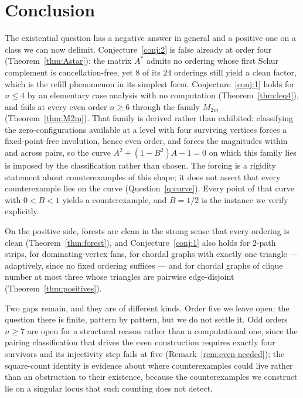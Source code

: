 \documentclass[11pt]{article}
\theoremstyle{plain}
\theoremstyle{definition}
\begin{document}
\section{Conclusion}
\begin{humanblock}
The existential question has a negative answer in general and a positive one on a class we can now
delimit. Conjecture~\ref{conj:2} is false already at order four (Theorem~\ref{thm:Astar}): the matrix
$A^*$ admits no ordering whose first Schur complement is cancellation-free, yet $8$ of its $24$
orderings still yield a clean factor, which is the refill phenomenon in its simplest form.
Conjecture~\ref{conj:1} holds for $n\le4$ by an elementary case analysis with no computation
(Theorem~\ref{thm:leq4}), and fails at every even order $n\ge6$ through the family $M_{2m}$
(Theorem~\ref{thm:M2m}). That family is derived rather than exhibited: classifying the
zero-configurations available at a level with four surviving vertices forces a fixed-point-free
involution, hence even order, and forces the magnitudes within and across pairs, so the curve
$A^2+(1-B^2)A-1=0$ on which this family lies is imposed by the classification rather than chosen. The
forcing is a rigidity statement about counterexamples of this shape; it does not assert that every
counterexample lies on the curve (Question~\ref{q:curve}). Every point of that curve with $0<B<1$
yields a counterexample, and $B=1/2$ is the instance we
verify explicitly.

On the positive side, forests are clean in the strong sense that every ordering is clean
(Theorem~\ref{thm:forest}), and Conjecture~\ref{conj:1} also holds for $2$-path strips, for
dominating-vertex fans, for chordal graphs with exactly one triangle --- adaptively, since no fixed
ordering suffices --- and for chordal graphs of clique number at most three whose triangles are
pairwise edge-disjoint (Theorem~\ref{thm:positives}).

Two gaps remain, and they are of different kinds. Order five we leave open: the question there is
finite, pattern by pattern, but we do not settle it. Odd orders $n\ge7$ are open for a structural
reason rather than a computational one, since the pairing classification that drives the even
construction requires exactly four survivors and its injectivity step fails at five
(Remark~\ref{rem:even-needed}); the square-count identity is evidence about where counterexamples
could live rather than an obstruction to their existence, because the counterexamples we construct lie
on a singular locus that such counting does not detect.


\end{humanblock}
\end{document}
